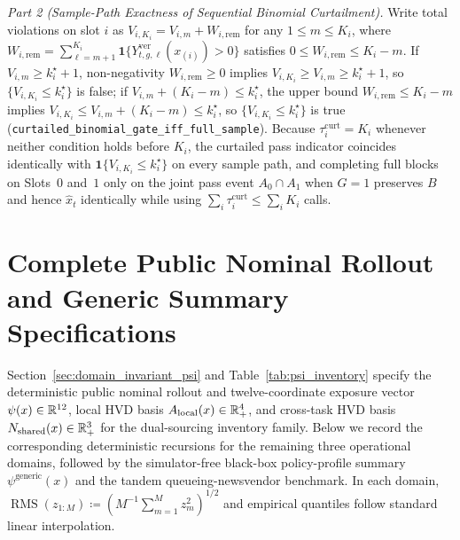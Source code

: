 \emph{Part 2 (Sample-Path Exactness of Sequential Binomial Curtailment).} Write total violations on slot $i$ as $V_{i,K_i} = V_{i,m} + W_{i,\mathrm{rem}}$ for any $1 \le m \le K_i$, where $W_{i,\mathrm{rem}} = \sum_{\ell=m+1}^{K_i}\mathbf{1}\{Y_{t,g,\ell}^{\mathrm{ver}}(x_{(i)}) > 0\}$ satisfies $0 \le W_{i,\mathrm{rem}} \le K_i - m$. If $V_{i,m} \ge k_i^\star + 1$, non-negativity $W_{i,\mathrm{rem}} \ge 0$ implies $V_{i,K_i} \ge V_{i,m} \ge k_i^\star + 1$, so $\{V_{i,K_i} \le k_i^\star\}$ is false; if $V_{i,m} + (K_i - m) \le k_i^\star$, the upper bound $W_{i,\mathrm{rem}} \le K_i - m$ implies $V_{i,K_i} \le V_{i,m} + (K_i - m) \le k_i^\star$, so $\{V_{i,K_i} \le k_i^\star\}$ is true (\texttt{curtailed\_binomial\_gate\_iff\_full\_sample}). Because $\tau_i^{\mathrm{curt}} = K_i$ whenever neither condition holds before $K_i$, the curtailed pass indicator coincides identically with $\mathbf{1}\{V_{i,K_i} \le k_i^\star\}$ on every sample path, and completing full blocks on Slots~$0$ and~$1$ only on the joint pass event $A_0 \cap A_1$ when $G=1$ preserves $B$ and hence $\hat{x}_t$ identically while using $\sum_i \tau_i^{\mathrm{curt}} \le \sum_i K_i$ calls.
\Halmos\endproof

\section{Complete Public Nominal Rollout and Generic Summary Specifications}\label{ec:psi_specs}

Section~\ref*{sec:domain_invariant_psi} and Table~\ref*{tab:psi_inventory} specify the deterministic public nominal rollout and twelve-coordinate exposure vector $\psi(x) \in \mathbb{R}^{12}$, local HVD basis $A_{\mathrm{local}}(x) \in \mathbb{R}_+^4$, and cross-task HVD basis $N_{\mathrm{shared}}(x) \in \mathbb{R}_+^3$ for the dual-sourcing inventory family. Below we record the corresponding deterministic recursions for the remaining three operational domains, followed by the simulator-free black-box policy-profile summary $\psi^{\mathrm{generic}}(x)$ and the tandem queueing-newsvendor benchmark. In each domain, $\operatorname{RMS}(z_{1:M}) \coloneqq (M^{-1}\sum_{m=1}^M z_m^2)^{1/2}$ and empirical quantiles follow standard linear interpolation.

